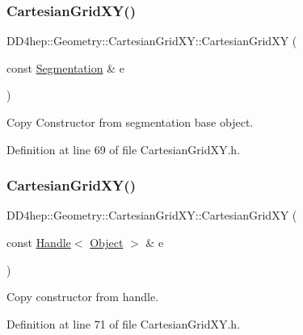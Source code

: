 \subsubsection{\texorpdfstring{Cartesian\+Grid\+X\+Y()}{CartesianGridXY()}\hspace{0.1cm}{\footnotesize\ttfamily [3/5]}}
{\footnotesize\ttfamily D\+D4hep\+::\+Geometry\+::\+Cartesian\+Grid\+X\+Y\+::\+Cartesian\+Grid\+XY (\begin{DoxyParamCaption}\item[{const \hyperlink{class_d_d4hep_1_1_geometry_1_1_segmentation}{Segmentation} \&}]{e }\end{DoxyParamCaption})\hspace{0.3cm}{\ttfamily [inline]}}



Copy Constructor from segmentation base object. 



Definition at line 69 of file Cartesian\+Grid\+X\+Y.\+h.

\hypertarget{class_d_d4hep_1_1_geometry_1_1_cartesian_grid_x_y_a5ac01bc898ef0925a5f80e2df58da136}{}\label{class_d_d4hep_1_1_geometry_1_1_cartesian_grid_x_y_a5ac01bc898ef0925a5f80e2df58da136} 
\subsubsection{\texorpdfstring{Cartesian\+Grid\+X\+Y()}{CartesianGridXY()}\hspace{0.1cm}{\footnotesize\ttfamily [4/5]}}
{\footnotesize\ttfamily D\+D4hep\+::\+Geometry\+::\+Cartesian\+Grid\+X\+Y\+::\+Cartesian\+Grid\+XY (\begin{DoxyParamCaption}\item[{const \hyperlink{class_d_d4hep_1_1_handle}{Handle}$<$ \hyperlink{class_d_d4hep_1_1_geometry_1_1_cartesian_grid_x_y_ab59ffe7391d8eb8e0b922e7965272808}{Object} $>$ \&}]{e }\end{DoxyParamCaption})\hspace{0.3cm}{\ttfamily [inline]}}



Copy constructor from handle. 



Definition at line 71 of file Cartesian\+Grid\+X\+Y.\+h.

